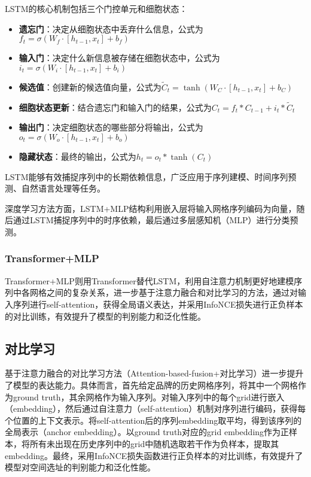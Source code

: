 \documentclass{article}
\begin{document}
LSTM的核心机制包括三个门控单元和细胞状态：

\begin{itemize}
\item \textbf{遗忘门}：决定从细胞状态中丢弃什么信息，公式为$f_t = \sigma(W_f \cdot [h_{t-1}, x_t] + b_f)$
\item \textbf{输入门}：决定什么新信息被存储在细胞状态中，公式为$i_t = \sigma(W_i \cdot [h_{t-1}, x_t] + b_i)$
\item \textbf{候选值}：创建新的候选值向量，公式为$\tilde{C}_t = \tanh(W_C \cdot [h_{t-1}, x_t] + b_C)$
\item \textbf{细胞状态更新}：结合遗忘门和输入门的结果，公式为$C_t = f_t * C_{t-1} + i_t * \tilde{C}_t$
\item \textbf{输出门}：决定细胞状态的哪些部分将输出，公式为$o_t = \sigma(W_o \cdot [h_{t-1}, x_t] + b_o)$
\item \textbf{隐藏状态}：最终的输出，公式为$h_t = o_t * \tanh(C_t)$
\end{itemize}

LSTM能够有效捕捉序列中的长期依赖信息，广泛应用于序列建模、时间序列预测、自然语言处理等任务。

深度学习方法方面，LSTM+MLP结构利用嵌入层将输入网格序列编码为向量，随后通过LSTM捕捉序列中的时序依赖\cite{hochreiter_long_1997}，最后通过多层感知机（MLP）进行分类预测。

\subsubsection{Transformer+MLP}

Transformer+MLP则用Transformer替代LSTM，利用自注意力机制更好地建模序列中各网格之间的复杂关系\cite{vaswani_attention_2023}，进一步基于注意力融合和对比学习的方法，通过对输入序列进行self-attention，获得全局语义表达，并采用InfoNCE损失进行正负样本的对比训练，有效提升了模型的判别能力和泛化性能。

\subsection{对比学习}

基于注意力融合的对比学习方法（Attention-based-fusion+对比学习）进一步提升了模型的表达能力。具体而言，首先给定品牌的历史网格序列，将其中一个网格作为ground truth，其余网格作为输入序列。对输入序列中的每个grid进行嵌入（embedding），然后通过自注意力（self-attention）机制对序列进行编码，获得每个位置的上下文表示。将self-attention后的序列embedding取平均，得到该序列的全局表示（anchor embedding）。以ground truth对应的grid embedding作为正样本，将所有未出现在历史序列中的grid中随机选取若干作为负样本，提取其embedding。最终，采用InfoNCE损失函数进行正负样本的对比训练，有效提升了模型对空间选址的判别能力和泛化性能。
\end{document}
